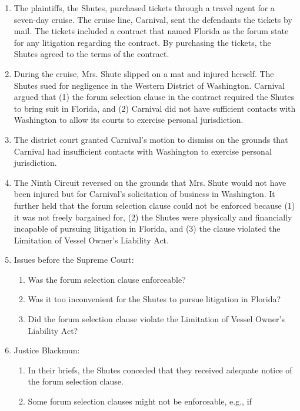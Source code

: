 \begin{enumerate}
    \item The plaintiffs, the Shutes, purchased tickets through a travel agent 
    for a seven-day cruise. The cruise line, Carnival, sent the defendants the 
    tickets by mail. The tickets included a contract that named Florida as the 
    forum state for any litigation regarding the contract. By purchasing the 
    tickets, the Shutes agreed to the terms of the contract.
    \item During the cruise, Mrs. Shute slipped on a mat and injured herself.  
    The Shutes sued for negligence in the Western District of Washington. 
    Carnival argued that (1) the forum selection clause in the contract 
    required the Shutes to bring suit in Florida, and (2) Carnival did not 
    have sufficient contacts with Washington to allow its courts to exercise 
    personal jurisdiction.
    \item The district court granted Carnival's motion to dismiss on the 
    grounds that Carnival had insufficient contacts with Washington to 
    exercise personal jurisdiction.
    \item The Ninth Circuit reversed on the grounds that Mrs. Shute would not 
    have been injured but for Carnival's solicitation of business in 
    Washington. It further held that the forum selection clause could not be 
    enforced because (1) it was not freely bargained for, (2) the Shutes were 
    physically and financially incapable of pursuing litigation in Florida, 
    and (3) the clause violated the Limitation of Vessel Owner's Liability 
    Act.
    \item Issues before the Supreme Court:
    \begin{enumerate}
        \item Was the forum selection clause enforceable?
        \item Was it too inconvenient for the Shutes to pursue litigation in 
        Florida?
        \item Did the forum selection clause violate the Limitation of Vessel 
        Owner's Liability Act?
    \end{enumerate}
    \item Justice Blackmun:
    \begin{enumerate}
        \item In their briefs, the Shutes conceded that they received adequate 
        notice of the forum selection clause.
        \item Some forum selection clauses might not be enforceable, e.g., if 

\end{enumerate}
\end{enumerate}
